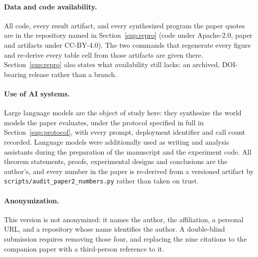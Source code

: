 \documentclass[11pt]{article}
\theoremstyle{definition}
\theoremstyle{remark}
\begin{document}
\paragraph{Data and code availability.} All code, every result artifact, and every
synthesized program the paper quotes are in the repository named in Section~\ref{sup:repro}
(code under Apache-2.0, paper and artifacts under CC-BY-4.0). The two commands that
regenerate every figure and re-derive every table cell from those artifacts are given there.
Section~\ref{sup:repro} also states what availability still lacks: an archived, DOI-bearing
release rather than a branch.

\paragraph{Use of AI systems.} Large language models are the object of study here: they
synthesize the world models the paper evaluates, under the protocol specified in full in
Section~\ref{sup:protocol}, with every prompt, deployment identifier and call count
recorded. Language models were additionally used as writing and analysis assistants during
the preparation of the manuscript and the experiment code. All theorem statements, proofs,
experimental designs and conclusions are the author's, and every number in the paper is
re-derived from a versioned artifact by \texttt{scripts/audit\_paper2\_numbers.py} rather
than taken on trust.

\paragraph{Anonymization.} This version is not anonymized: it names the author, the
affiliation, a personal URL, and a repository whose name identifies the author. A
double-blind submission requires removing those four, and replacing the nine citations to
the companion paper with a third-person reference to it.


\end{document}
